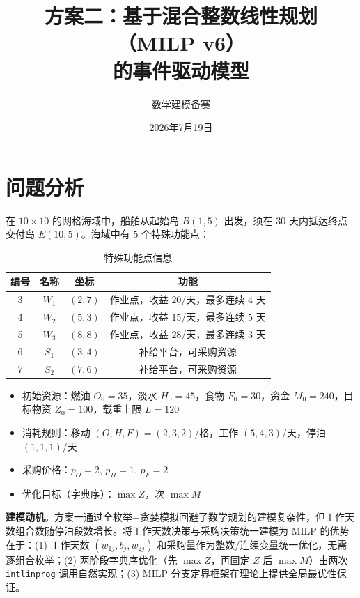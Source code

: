 \documentclass[12pt,a4paper]{ctexart}
\title{\textbf{方案二：基于混合整数线性规划（MILP v6）\\的事件驱动模型}}
\author{数学建模备赛}
\date{2026年7月19日}
\theoremstyle{definition}
\begin{document}
\maketitle

\section{问题分析}

在 $10\times 10$ 的网格海域中，船舶从起始岛 $B(1,5)$ 出发，须在 $30$ 天内抵达终点交付岛 $E(10,5)$。海域中有 $5$ 个特殊功能点：

\begin{table}[H]
  \centering
  \caption{特殊功能点信息}
  \begin{tabular}{cccc}
    \toprule
    编号 & 名称 & 坐标 & 功能 \\
    \midrule
    3 & $W_1$ & $(2,7)$ & 作业点，收益 $20$/天，最多连续 $4$ 天 \\
    4 & $W_2$ & $(5,3)$ & 作业点，收益 $15$/天，最多连续 $5$ 天 \\
    5 & $W_3$ & $(8,8)$ & 作业点，收益 $28$/天，最多连续 $3$ 天 \\
    6 & $S_1$ & $(3,4)$ & 补给平台，可采购资源 \\
    7 & $S_2$ & $(7,6)$ & 补给平台，可采购资源 \\
    \bottomrule
  \end{tabular}
\end{table}

\begin{itemize}
  \item 初始资源：燃油 $O_0=35$，淡水 $H_0=45$，食物 $F_0=30$，资金 $M_0=240$，目标物资 $Z_0=100$，载重上限 $L=120$
  \item 消耗规则：移动 $(O,H,F)=(2,3,2)$/格，工作 $(5,4,3)$/天，停泊 $(1,1,1)$/天
  \item 采购价格：$p_O=2$, $p_H=1$, $p_F=2$
  \item 优化目标（字典序）：$\max Z$，次 $\max M$
\end{itemize}

\textbf{建模动机}。方案一通过全枚举+贪婪模拟回避了数学规划的建模复杂性，但工作天数组合数随停泊段数增长。将工作天数决策与采购决策统一建模为 MILP 的优势在于：(1) 工作天数 $(w_{1j},b_j,w_{2j})$ 和采购量作为整数/连续变量统一优化，无需逐组合枚举；(2) 两阶段字典序优化（先 $\max Z$，再固定 $Z$ 后 $\max M$）由两次 \texttt{intlinprog} 调用自然实现；(3) MILP 分支定界框架在理论上提供全局最优性保证。
\end{document}
